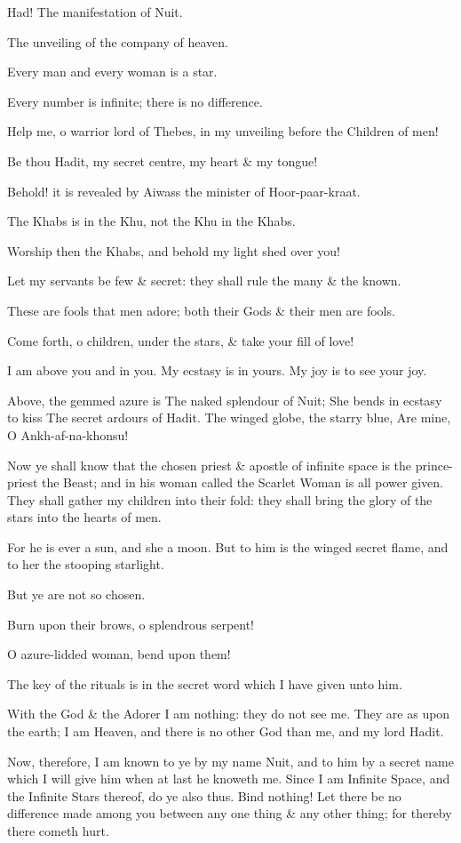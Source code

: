 Had! The manifestation of Nuit.

The unveiling of the company of heaven.

Every man and every woman is a star.

Every number is infinite; there is no difference.

Help me, o warrior lord of Thebes, in my unveiling before the Children of men!

Be thou Hadit, my secret centre, my heart & my tongue!

Behold! it is revealed by Aiwass the minister of Hoor-paar-kraat.

The Khabs is in the Khu, not the Khu in the Khabs.

Worship then the Khabs, and behold my light shed over you!

Let my servants be few & secret: they shall rule the many & the known.

These are fools that men adore; both their Gods & their men are fools.

Come forth, o children, under the stars, & take your fill of love!

I am above you and in you. My ecstasy is in yours. My joy is to see your joy.

Above, the gemmed azure is
The naked splendour of Nuit;
She bends in ecstasy to kiss
The secret ardours of Hadit.
The winged globe, the starry blue,
Are mine, O Ankh-af-na-khonsu!

Now ye shall know that the chosen priest & apostle of infinite space is the prince-priest the Beast; and in his woman called the Scarlet Woman is all power given. They shall gather my children into their fold: they shall bring the glory of the stars into the hearts of men.

For he is ever a sun, and she a moon. But to him is the winged secret flame, and to her the stooping starlight.

But ye are not so chosen.

Burn upon their brows, o splendrous serpent!

O azure-lidded woman, bend upon them!

The key of the rituals is in the secret word which I have given unto him.

With the God & the Adorer I am nothing: they do not see me. They are as upon the earth; I am Heaven, and there is no other God than me, and my lord Hadit.

Now, therefore, I am known to ye by my name Nuit, and to him by a secret name which I will give him when at last he knoweth me. Since I am Infinite Space, and the Infinite Stars thereof, do ye also thus. Bind nothing! Let there be no difference made among you between any one thing & any other thing; for thereby there cometh hurt.

